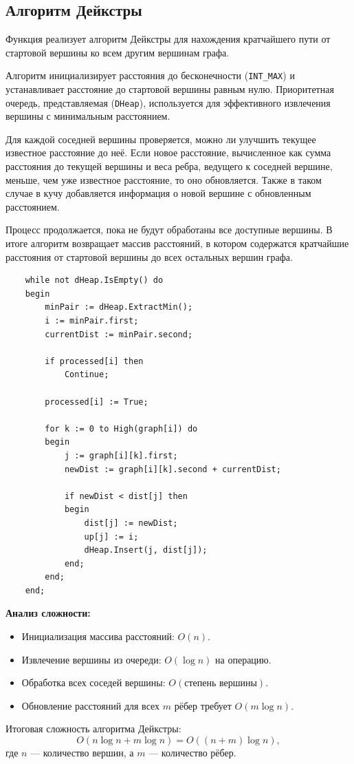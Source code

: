 \subsection*{Алгоритм Дейкстры}

Функция реализует алгоритм Дейкстры для нахождения кратчайшего пути от стартовой вершины ко всем другим вершинам графа.

Алгоритм инициализирует расстояния до бесконечности (\texttt{INT\_MAX}) и устанавливает расстояние до стартовой вершины равным нулю. Приоритетная очередь, представляемая (\texttt{DHeap}), используется для эффективного извлечения вершины с минимальным расстоянием. 

Для каждой соседней вершины проверяется, можно ли улучшить текущее известное расстояние до неё. Если новое расстояние, вычисленное как сумма расстояния до текущей вершины и веса ребра, ведущего к соседней вершине, меньше, чем уже известное расстояние, то оно обновляется. Также в таком случае в кучу добавляется информация о новой вершине с обновленным расстоянием.

Процесс продолжается, пока не будут обработаны все доступные вершины. В итоге алгоритм возвращает массив расстояний, в котором содержатся кратчайшие расстояния от стартовой вершины до всех остальных вершин графа.

\begin{lstlisting}
    while not dHeap.IsEmpty() do
    begin
        minPair := dHeap.ExtractMin();
        i := minPair.first;
        currentDist := minPair.second;

        if processed[i] then 
            Continue; 

        processed[i] := True;

        for k := 0 to High(graph[i]) do
        begin
            j := graph[i][k].first;
            newDist := graph[i][k].second + currentDist;

            if newDist < dist[j] then
            begin
                dist[j] := newDist;
                up[j] := i;
                dHeap.Insert(j, dist[j]);
            end;
        end;
    end;
\end{lstlisting}

\textbf{Анализ сложности:}
\begin{itemize}
    \item Инициализация массива расстояний: \(O(n)\).
    \item Извлечение вершины из очереди: \(O(\log n)\) на операцию.
    \item Обработка всех соседей вершины: \(O(\text{степень вершины})\).
    \item Обновление расстояний для всех \(m\) рёбер требует \(O(m \log n)\).
\end{itemize}

Итоговая сложность алгоритма Дейкстры:
\[
O(n \log n + m \log n) = O((n + m) \log n),
\]
где \(n\) — количество вершин, а \(m\) — количество рёбер.
